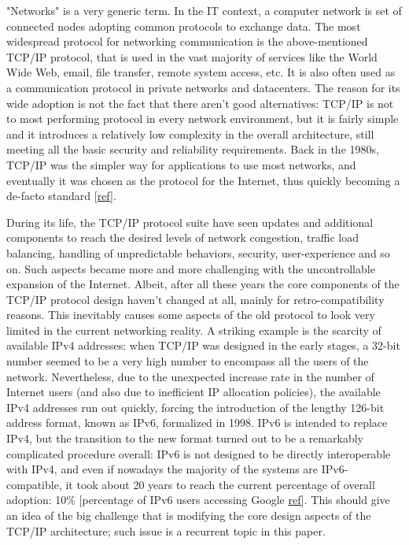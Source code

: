 "Networks" is a very generic term. In the IT context, a computer network is set of connected nodes adopting common protocols to exchange data. The most widespread protocol for networking communication is the above-mentioned TCP/IP protocol, that is used in the vast majority of services like the World Wide Web, email, file transfer, remote system access, etc. It is also often used as a communication protocol in private networks and datacenters.
The reason for its wide adoption is not the fact that there aren't good alternatives: TCP/IP is not to most performing protocol in every network environment, but it is fairly simple and it introduces a relatively low complexity in the overall architecture, still meeting all the basic security and reliability requirements. Back in the 1980s, TCP/IP was the simpler way for applications to use most networks, and eventually it was chosen as the protocol for the Internet, thus quickly becoming a de-facto standard [\href{http://www.computerworld.com/article/2593612/networking/tcp-ip.html}{ref}]. 



During its life, the TCP/IP protocol suite have seen updates and additional components to reach the desired levels of network congestion, traffic load balancing, handling of unpredictable behaviors, security, user-experience and so on. Such aspects became more and more challenging with the uncontrollable expansion of the Internet. 
Albeit, after all these years the core components of the TCP/IP protocol design haven't changed at all, mainly for retro-compatibility reasons. This inevitably causes some aspects of the old protocol to look very limited in the current networking reality. A striking example is the scarcity of available IPv4 addresses: when TCP/IP was designed in the early stages, a 32-bit number seemed to be a very high number to encompass all the users of the network. Nevertheless, due to the unexpected increase rate in the number of Internet users (and also due to inefficient IP allocation policies), the available IPv4 addresses run out quickly, forcing the introduction of the lengthy 126-bit address format, known as IPv6, formalized in 1998. IPv6 is intended to replace IPv4, but the transition to the new format turned out to be a remarkably complicated procedure overall: IPv6 is not designed to be directly interoperable with IPv4, and even if nowadays the majority of the systems are IPv6-compatible, it took about 20 years to reach the current percentage of overall adoption: 10\% [percentage of IPv6 users accessing Google \href{http://www.google.com/intl/en/ipv6/statistics.html#tab=ipv6-adoption&tab=ipv6-adoption}{ref}]. This should give an idea of the big challenge that is modifying the core design aspects of the TCP/IP architecture; such issue is a recurrent topic in this paper.

